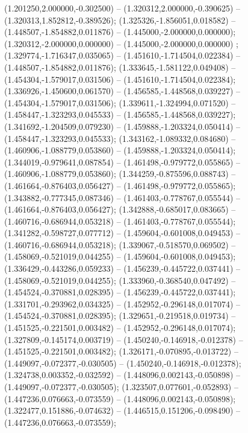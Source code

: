  (1.201250,2.000000,-0.302500) -- (1.320312,2.000000,-0.390625) -- (1.320313,1.852812,-0.389526);
 (1.325326,-1.856051,0.018582) -- (1.448507,-1.854882,0.011876) -- (1.445000,-2.000000,0.000000);
 (1.320312,-2.000000,0.000000) -- (1.445000,-2.000000,0.000000) ;
 (1.329774,-1.716347,0.035065) -- (1.451610,-1.714504,0.022384) -- (1.448507,-1.854882,0.011876);
 (1.333645,-1.581122,0.049408) -- (1.454304,-1.579017,0.031506) -- (1.451610,-1.714504,0.022384);
 (1.336926,-1.450600,0.061570) -- (1.456585,-1.448568,0.039227) -- (1.454304,-1.579017,0.031506);
 (1.339611,-1.324994,0.071520) -- (1.458447,-1.323293,0.045533) -- (1.456585,-1.448568,0.039227);
 (1.341692,-1.204509,0.079230) -- (1.459888,-1.203324,0.050414) -- (1.458447,-1.323293,0.045533);
 (1.343162,-1.089332,0.084680) -- (1.460906,-1.088779,0.053860) -- (1.459888,-1.203324,0.050414);
 (1.344019,-0.979641,0.087854) -- (1.461498,-0.979772,0.055865) -- (1.460906,-1.088779,0.053860);
 (1.344259,-0.875596,0.088743) -- (1.461664,-0.876403,0.056427) -- (1.461498,-0.979772,0.055865);
 (1.343882,-0.777345,0.087346) -- (1.461403,-0.778767,0.055544) -- (1.461664,-0.876403,0.056427);
 (1.342888,-0.685017,0.083665) -- (1.460716,-0.686944,0.053218) -- (1.461403,-0.778767,0.055544);
 (1.341282,-0.598727,0.077712) -- (1.459604,-0.601008,0.049453) -- (1.460716,-0.686944,0.053218);
 (1.339067,-0.518570,0.069502) -- (1.458069,-0.521019,0.044255) -- (1.459604,-0.601008,0.049453);
 (1.336429,-0.443286,0.059233) -- (1.456239,-0.445722,0.037441) -- (1.458069,-0.521019,0.044255);
 (1.333960,-0.368540,0.047492) -- (1.454524,-0.370881,0.028395) -- (1.456239,-0.445722,0.037441);
 (1.331701,-0.293962,0.034325) -- (1.452952,-0.296148,0.017074) -- (1.454524,-0.370881,0.028395);
 (1.329651,-0.219518,0.019734) -- (1.451525,-0.221501,0.003482) -- (1.452952,-0.296148,0.017074);
 (1.327809,-0.145174,0.003719) -- (1.450240,-0.146918,-0.012378) -- (1.451525,-0.221501,0.003482);
 (1.326171,-0.070895,-0.013722) -- (1.449097,-0.072377,-0.030505) -- (1.450240,-0.146918,-0.012378);
 (1.324738,0.003352,-0.032592) -- (1.448096,0.002143,-0.050898) -- (1.449097,-0.072377,-0.030505);
 (1.323507,0.077601,-0.052893) -- (1.447236,0.076663,-0.073559) -- (1.448096,0.002143,-0.050898);
 (1.322477,0.151886,-0.074632) -- (1.446515,0.151206,-0.098490) -- (1.447236,0.076663,-0.073559);
